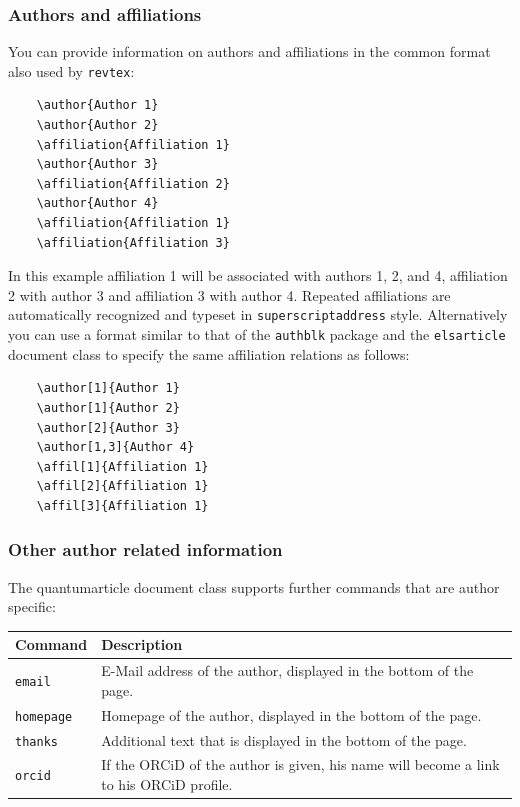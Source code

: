 \documentclass[a4paper,noarxiv,onecolumn]{quantumarticle}
\newenvironment{commands}
{\medskip\noindent\begin{longtable}{p{.20\columnwidth}p{.744\columnwidth}}
		\textsf{Command} & \textsf{Description} \\
		\midrule
	}
	{\bottomrule\end{longtable}}
\newcommand{\command}[2]{
	\small\texttt{#1} & {\small#2} \\
}
\begin{document}
	\subsubsection{Authors and affiliations}
	You can provide information on authors and affiliations in the common format also used by \texttt{revtex}:
	\begin{verbatim}
	\author{Author 1}
	\author{Author 2}
	\affiliation{Affiliation 1}
	\author{Author 3}
	\affiliation{Affiliation 2}
	\author{Author 4}
	\affiliation{Affiliation 1}
	\affiliation{Affiliation 3}
	\end{verbatim}
	In this example affiliation 1 will be associated with authors 1, 2, and 4, affiliation 2 with author 3 and affiliation 3 with author 4.
	Repeated affiliations are automatically recognized and typeset in \texttt{superscriptaddress} style.
	Alternatively you can use a format similar to that of the \texttt{authblk} package and the \texttt{elsarticle} document class to specify the same affiliation relations as follows:
	\begin{verbatim}
	\author[1]{Author 1}
	\author[1]{Author 2}
	\author[2]{Author 3}
	\author[1,3]{Author 4}
	\affil[1]{Affiliation 1}
	\affil[2]{Affiliation 1}
	\affil[3]{Affiliation 1}
	\end{verbatim}

	\subsubsection{Other author related information}
	The quantumarticle document class supports further commands that are author specific:
	\begin{commands}
		\command{email}{%
			E-Mail address of the author, displayed in the bottom of the page.
		}

		\command{homepage}{%
			Homepage of the author, displayed in the bottom of the page.
		}

		\command{thanks}{%
			Additional text that is displayed in the bottom of the page.
		}

		\command{orcid}{%
			If the ORCiD of the author is given, his name will become a link to his ORCiD profile.
		}
	\end{commands}
\end{document}
